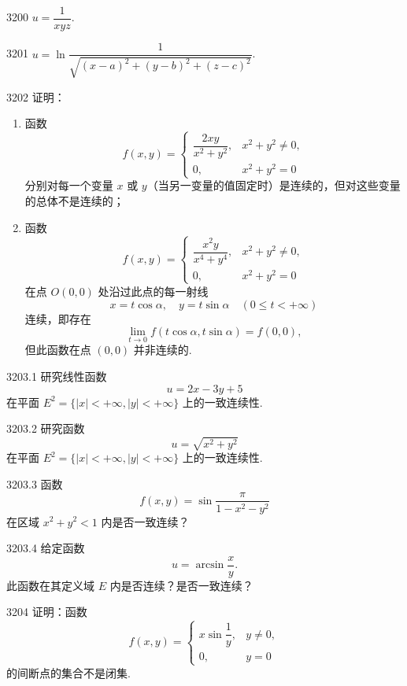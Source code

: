 \begin{prob}[S]{3200}
$u = \dfrac{1}{xyz}$.
\end{prob}

\begin{prob}[S]{3201}
$u = \ln\dfrac{1}{\sqrt{(x - a)^2 + (y - b)^2 + (z - c)^2}}$.
\end{prob}

\begin{prob}[L]{3202}
证明：
\begin{enumerate}[label=(\alph*), itemsep=2pt, topsep=3pt]
\item 函数
\[
f(x, y) = \begin{cases}
\dfrac{2xy}{x^2 + y^2}, & x^2 + y^2 \neq 0, \\
0, & x^2 + y^2 = 0
\end{cases}
\]
分别对每一个变量 $x$ 或 $y$（当另一变量的值固定时）是连续的，但对这些变量的总体不是连续的；
\item 函数
\[
f(x, y) = \begin{cases}
\dfrac{x^2 y}{x^4 + y^4}, & x^2 + y^2 \neq 0, \\
0, & x^2 + y^2 = 0
\end{cases}
\]
在点 $O(0, 0)$ 处沿过此点的每一射线
\[
x = t\cos\alpha, \quad y = t\sin\alpha \quad (0 \leqslant t < +\infty)
\]
连续，即存在
\[
\lim_{t \to 0} f(t\cos\alpha, t\sin\alpha) = f(0, 0),
\]
但此函数在点 $(0, 0)$ 并非连续的.
\end{enumerate}
\end{prob}

\begin{prob}[M]{3203.1}
研究线性函数
\[
u = 2x - 3y + 5
\]
在平面 $E^2 = \{|x| < +\infty, |y| < +\infty\}$ 上的一致连续性.
\end{prob}

\begin{prob}[M]{3203.2}
研究函数
\[
u = \sqrt{x^2 + y^2}
\]
在平面 $E^2 = \{|x| < +\infty, |y| < +\infty\}$ 上的一致连续性.
\end{prob}

\begin{prob}[M]{3203.3}
函数
\[
f(x, y) = \sin\frac{\pi}{1 - x^2 - y^2}
\]
在区域 $x^2 + y^2 < 1$ 内是否一致连续？
\end{prob}

\begin{prob}[M]{3203.4}
给定函数
\[
u = \arcsin\frac{x}{y}.
\]
此函数在其定义域 $E$ 内是否连续？是否一致连续？
\end{prob}

\begin{prob}[M]{3204}
证明：函数
\[
f(x, y) = \begin{cases}
x\sin\dfrac{1}{y}, & y \neq 0, \\
0, & y = 0
\end{cases}
\]
的间断点的集合不是闭集.
\end{prob}

